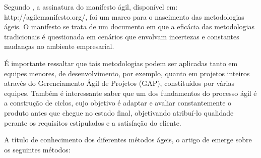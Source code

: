 Segundo , a assinatura do manifesto ágil, disponível em: \textsf{http://agilemanifesto.org/}, foi um marco para o nascimento das metodologias ágeis. O manifesto se trata de um documento em que a eficácia das metodologias tradicionais é questionada em cenários que envolvam incertezas e constantes mudanças no ambiente empresarial. 

É importante ressaltar que tais metodologias podem ser aplicadas tanto em equipes menores, de desenvolvimento, por exemplo, quanto em projetos inteiros através do Gerenciamento Ágil de Projetos (GAP), constituídos por várias equipes. Também é interessante saber que um dos fundamentos do processo ágil é a construção de ciclos, cujo objetivo é adaptar e avaliar constantemente o produto antes que chegue no estado final, objetivando atribuí-lo qualidade perante os requisitos estipulados e a satisfação do cliente.

A título de conhecimento dos diferentes métodos ágeis, o artigo de  emerge sobre os seguintes métodos:

